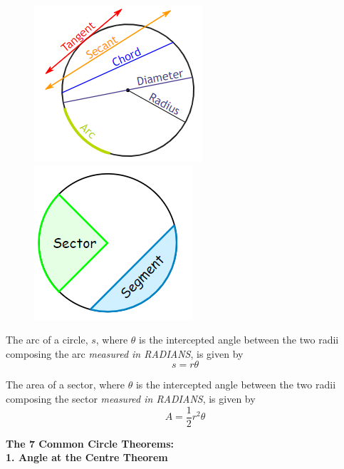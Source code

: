         \begin{figure} [hbt!]
            \centering
            \includegraphics[scale = 0.8] {Resources/Unit4Circles/lines.PNG}
            \includegraphics[scale = 0.8] {Resources/Unit4Circles/slices.PNG}
        \end{figure}

        \noindent The arc of a circle, $s$, where $\theta$ is the intercepted angle between the
        two radii composing the arc \textit{measured in RADIANS}, is given by \\

        \begin{equation*}
            s=r\theta
        \end{equation*}

        \noindent The area of a sector, where $\theta$ is the intercepted angle between the two
        radii composing the sector \textit{measured in RADIANS}, is given by \\

        \begin{equation*}
            A=\frac{1}{2} r^2 \theta
        \end{equation*}

        \noindent \color{purple} \textbf{The 7 Common Circle Theorems:} \color{black} \\

        \noindent \color{purple} \textbf{1. Angle at the Centre Theorem} \color{black} \\

